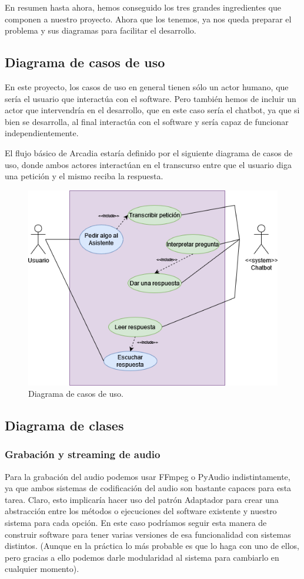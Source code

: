 En resumen hasta ahora, hemos conseguido los tres grandes ingredientes que componen a nuestro proyecto. Ahora que los tenemos, ya nos queda preparar el problema y sus diagramas para facilitar el desarrollo.

\subsection{Diagrama de casos de uso}
En este proyecto, los casos de uso en general tienen sólo un actor humano, que sería el usuario que interactúa con el software. Pero también hemos de incluir un actor que intervendría en el desarrollo, que en este caso sería el chatbot, ya que si bien se desarrolla, al final interactúa con el software y sería capaz de funcionar independientemente.

El flujo básico de Arcadia estaría definido por el siguiente diagrama de casos de uso, donde ambos actores interactúan en el transcurso entre que el usuario diga una petición y el mismo reciba la respuesta.

\begin{figure}[H]
	\includegraphics[width=\textwidth]{imagenes/DiagramaCasosUso.png}
	\caption{Diagrama de casos de uso.}
\end{figure}

\subsection{Diagrama de clases}
\subsubsection{Grabación y streaming de audio}
Para la grabación del audio podemos usar FFmpeg o PyAudio indistintamente, ya que ambos sistemas de codificación del audio son bastante capaces para esta tarea. Claro, esto implicaría hacer uso del patrón Adaptador para crear una abstracción entre los métodos o ejecuciones del software existente y nuestro sistema para cada opción.
En este caso podríamos seguir esta manera de construir software para tener varias versiones de esa funcionalidad con sistemas distintos. (Aunque en la práctica lo más probable es que lo haga con uno de ellos, pero gracias a ello podemos darle modularidad al sistema para cambiarlo en cualquier momento).

